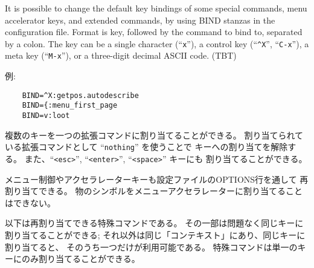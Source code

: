It is possible to change the default key bindings of some special commands,
menu accelerator keys, and extended commands, by using BIND stanzas in the
configuration file. Format is key, followed by the command to bind to,
separated by a colon. The key can be a single character (``{\tt x}''),
a control key (``{\tt \^{}X}'', ``{\tt C-x}''), a meta key (``{\tt M-x}''),
or a three-digit decimal ASCII code.
(TBT)

例:

\begin{verbatim}
    BIND=^X:getpos.autodescribe
    BIND={:menu_first_page
    BIND=v:loot
\end{verbatim}

\blist{}
\item[\tb{拡張コマンドキー}]
複数のキーを一つの拡張コマンドに割り当てることができる。
割り当てられている拡張コマンドとして ``{\tt nothing}'' を使うことで
キーへの割り当てを解除する。
また、``{\tt <esc>}'', ``{\tt <enter>}'', ``{\tt <space>}'' キーにも
割り当てることができる。

\item[\tb{メニューアクセラレーターキー}]
メニュー制御やアクセラレーターキーも設定ファイルのOPTIONS行を通して
再割り当てできる。
物のシンボルをメニューアクセラレーターに割り当てることはできない。

\item[\tb{特殊コマンドキー}]
以下は再割り当てできる特殊コマンドである。
その一部は問題なく同じキーに割り当てることができる;
それ以外は同じ「コンテキスト」にあり、同じキーに割り当てると、
そのうち一つだけが利用可能である。
特殊コマンドは単一のキーにのみ割り当てることができる。
\elist

